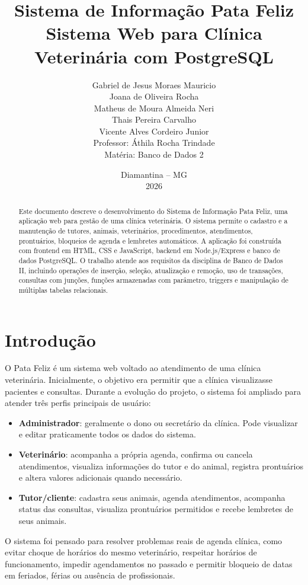 \documentclass[12pt,a4paper]{article}
\title{
  \textbf{Sistema de Informação Pata Feliz}\\
  \large Sistema Web para Clínica Veterinária com PostgreSQL
}
\author{
  Gabriel de Jesus Moraes Mauricio\\
  Joana de Oliveira Rocha\\
  Matheus de Moura Almeida Neri\\
  Thais Pereira Carvalho\\
  Vicente Alves Cordeiro Junior\\[0.4cm]
  Professor: Áthila Rocha Trindade\\
  Matéria: Banco de Dados 2
}
\date{Diamantina -- MG\\2026}
\begin{document}
\maketitle
\thispagestyle{empty}

\begin{abstract}
Este documento descreve o desenvolvimento do Sistema de Informação Pata Feliz, uma aplicação web para gestão de uma clínica veterinária. O sistema permite o cadastro e a manutenção de tutores, animais, veterinários, procedimentos, atendimentos, prontuários, bloqueios de agenda e lembretes automáticos. A aplicação foi construída com frontend em HTML, CSS e JavaScript, backend em Node.js/Express e banco de dados PostgreSQL. O trabalho atende aos requisitos da disciplina de Banco de Dados II, incluindo operações de inserção, seleção, atualização e remoção, uso de transações, consultas com junções, funções armazenadas com parâmetro, triggers e manipulação de múltiplas tabelas relacionais.
\end{abstract}

\newpage
\tableofcontents
\newpage

\section{Introdução}

O Pata Feliz é um sistema web voltado ao atendimento de uma clínica veterinária. Inicialmente, o objetivo era permitir que a clínica visualizasse pacientes e consultas. Durante a evolução do projeto, o sistema foi ampliado para atender três perfis principais de usuário:

\begin{itemize}[leftmargin=*]
  \item \textbf{Administrador}: geralmente o dono ou secretário da clínica. Pode visualizar e editar praticamente todos os dados do sistema.
  \item \textbf{Veterinário}: acompanha a própria agenda, confirma ou cancela atendimentos, visualiza informações do tutor e do animal, registra prontuários e altera valores adicionais quando necessário.
  \item \textbf{Tutor/cliente}: cadastra seus animais, agenda atendimentos, acompanha status das consultas, visualiza prontuários permitidos e recebe lembretes de seus animais.
\end{itemize}

O sistema foi pensado para resolver problemas reais de agenda clínica, como evitar choque de horários do mesmo veterinário, respeitar horários de funcionamento, impedir agendamentos no passado e permitir bloqueio de datas em feriados, férias ou ausência de profissionais.
\end{document}
